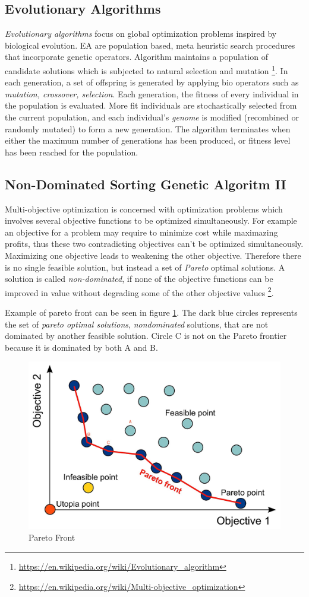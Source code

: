 \documentclass[format=acmsmall, review=false, screen=true]{acmart}
\begin{document}
\subsection{Evolutionary Algorithms}

\emph{Evolutionary algorithms} focus on global optimization problems inspired by biological evolution. EA are population based, meta heuristic search procedures that incorporate genetic operators. Algorithm maintains a population of candidate solutions which is subjected to natural selection and mutation \footnote{\url{https://en.wikipedia.org/wiki/Evolutionary_algorithm}}. In each generation, a set of offspring is generated by applying bio operators such as \emph{mutation, crossover, selection}. Each generation, the fitness of every individual in the population is evaluated. More fit individuals are stochastically selected from the current population, and each individual's \emph{genome} is modified (recombined or randomly mutated) to form a new generation. The algorithm terminates when either the maximum number of generations has been produced, or fitness level has been reached for the population.

\subsection{Non-Dominated Sorting Genetic Algoritm II}

Multi-objective optimization is concerned with optimization problems which involves several objective functions to be optimized simultaneously. For example an objective for a problem may require to minimize cost while maximazing profits, thus these two contradicting objectives can't be optimized simultaneously. Maximizing one objective leads to weakening the other objective. Therefore there is no single feasible solution, but instead a set of \emph{Pareto} optimal solutions.  A solution is called \emph{non-dominated}, if none of the objective functions can be improved in value without degrading some of the other objective values \footnote{\url{https://en.wikipedia.org/wiki/Multi-objective_optimization}}.

Example of pareto front can be seen in figure \ref{fig:paretofront}. The dark blue circles represents the set of \emph{pareto optimal solutions}, \emph{nondominated} solutions, that are not dominated by another feasible solution. Circle C is not on the Pareto frontier because it is dominated by both A and B.

\begin{figure}[H]
  \includegraphics[width=0.66\linewidth]{img/pareto_front.JPG}
  \caption{\label{fig:paretofront}Pareto Front}
\end{figure}
\end{document}
